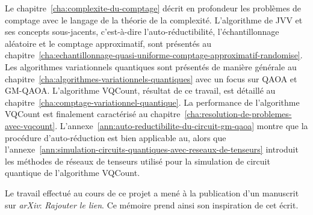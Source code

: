 Le chapitre~\ref{cha:complexite-du-comptage} décrit en profondeur les problèmes de comptage avec le langage de la théorie de la complexité. L'algorithme de JVV et ses concepts sous-jacents, c'est-à-dire l'auto-réductibilité, l'échantillonnage aléatoire et le comptage approximatif, sont présentés au chapitre~\ref{cha:echantillonnage-quasi-uniforme-comptage-approximatif-randomise}. Les algorithmes variationnels quantiques sont présentés de manière générale au chapitre~\ref{cha:algorithmes-variationnels-quantiques} avec un focus sur QAOA et GM-QAOA. L'algorithme VQCount, résultat de ce travail, est détaillé au chapitre~\ref{cha:comptage-variationnel-quantique}. La performance de l'algorithme VQCount est finalement caractérisé au chapitre~\ref{cha:resolution-de-problemes-avec-vqcount}. L'annexe~\ref{ann:auto-reductibilite-du-circuit-gm-qaoa} montre que la procédure d'auto-réduction est bien applicable au, alors que l'annexe~\ref{ann:simulation-circuits-quantiques-avec-reseaux-de-tenseurs} introduit les méthodes de réseaux de tenseurs utilisé pour la simulation de circuit quantique de l'algorithme VQCount.

Le travail effectué au cours de ce projet a mené à la publication d'un manuscrit sur \textit{arXiv}: \textcolor{mydarkred}{\textit{Rajouter le lien}}. Ce mémoire prend ainsi son inspiration de cet écrit.